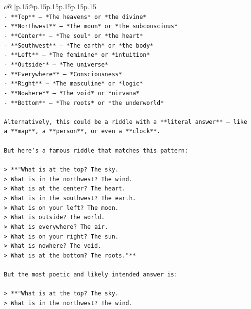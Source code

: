 \documentclass{article}
\begin{document}
{\begin{supertabular}{c@{$\;$}|p{.15\linewidth}@{}p{.15\linewidth}p{.15\linewidth}p{.15\linewidth}p{.15\linewidth}p{.15\linewidth}}
{{{\\ 
\texttt{{-} **Top** — *The heavens* or *the divine*  } \\
\texttt{{-} **Northwest** — *The moon* or *the subconscious*  } \\
\texttt{{-} **Center** — *The soul* or *the heart*  } \\
\texttt{{-} **Southwest** — *The earth* or *the body*  } \\
\texttt{{-} **Left** — *The feminine* or *intuition*  } \\
\texttt{{-} **Outside** — *The universe*  } \\
\texttt{{-} **Everywhere** — *Consciousness*  } \\
\texttt{{-} **Right** — *The masculine* or *logic*  } \\
\texttt{{-} **Nowhere** — *The void* or *nirvana*  } \\
\texttt{{-} **Bottom** — *The roots* or *the underworld*} \\
\\ 
\texttt{Alternatively, this could be a riddle with a **literal answer** — like a **map**, a **person**, or even a **clock**.} \\
\\ 
\texttt{But here's a famous riddle that matches this pattern:} \\
\\ 
\texttt{> **"What is at the top? The sky.  } \\
\texttt{> What is in the northwest? The wind.  } \\
\texttt{> What is at the center? The heart.  } \\
\texttt{> What is in the southwest? The earth.  } \\
\texttt{> What is on your left? The moon.  } \\
\texttt{> What is outside? The world.  } \\
\texttt{> What is everywhere? The air.  } \\
\texttt{> What is on your right? The sun.  } \\
\texttt{> What is nowhere? The void.  } \\
\texttt{> What is at the bottom? The roots."**} \\
\\ 
\texttt{But the most poetic and likely intended answer is:} \\
\\ 
\texttt{> **"What is at the top? The sky.  } \\
\texttt{> What is in the northwest? The wind.  } \\
}}}
\end{supertabular}}
\end{document}

